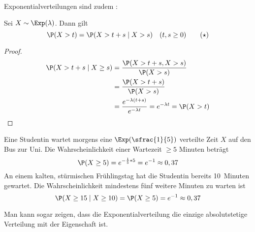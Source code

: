 Exponentialverteilungen sind zudem :
\begin{lemma}
	\label{4_4_lemma}
	Sei $X \sim \Exp(\lambda)$. Dann gilt
	\begin{equation*}
		\P(X>t) = \P(X > t+s \mid X > s) \quad (t,s \ge 0) \tag{$\star$}\label{4_4_eq:gedaechtnislos}
	\end{equation*}
\end{lemma}
\begin{proof}
	\begin{align*}
		\P(X > t+s \mid X \ge s) &= \frac{\P(X > t+s, X > s)}{\P(X > s)} \\
		&= \frac{\P(X > t+s)}{\P(X > s)} \\
		&= \frac{e^{-\lambda(t+s)}}{e^{-\lambda t}} = e^{-\lambda t} = \P(X> t)
	\end{align*}
\end{proof}

\begin{beispiel}
	\label{4_5_beispiel}
	Eine Studentin wartet morgens eine $\Exp(\sfrac{1}{5})$ verteilte Zeit $X$ auf den Bus zur Uni. Die Wahrscheinlichkeit einer Wartezeit $\ge 5$ Minuten beträgt
	\begin{equation*}
		\P(X \ge 5) = e^{-\frac{1}{5} * 5} = e^{-1} \approx 0,37
	\end{equation*}
	An einem kalten, stürmischen Frühlingstag hat die Studentin bereits 10~Minuten gewartet. Die Wahrscheinlichkeit mindestens fünf weitere Minuten zu warten ist
	\begin{equation*}
		\P(X\ge 15 \mid X \ge 10) = \P(X \ge 5) = e^{-1} \approx 0,37
	\end{equation*}
\end{beispiel}

\begin{*bemerkung}
	Man kann sogar zeigen, dass die Exponentialverteilung die einzige absolutstetige Verteilung mit der Eigenschaft  ist.
\end{*bemerkung}